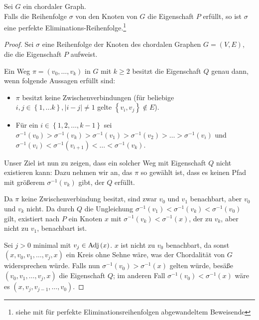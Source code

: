 \begin{theorem}
	Sei \( G \) ein chordaler Graph.\\
	Falls die Reihenfolge \( \sigma \) von den Knoten von \( G \) die Eigenschaft \( P \) erfüllt, so ist \( \sigma \) eine perfekte Eliminations-Reihenfolge.\footnote{siehe \cite[Lemma 4]{tarjanyannakakis} mit für perfekte Eliminationsreihenfolgen abgewandeltem Beweisende}
	\label{theorem:auspfolgtchordal}
\end{theorem}

\begin{proof}
	Sei \( \sigma \) eine Reihenfolge der Knoten des chordalen Graphen \( G = \left( V, E \right) \), die die Eigenschaft \( P \) aufweist.

	Ein Weg \( \pi = \left( v_0, \ldots, v_k \right) \) in \( G \) mit \( k \geq 2 \) besitzt die Eigenschaft \( Q \) genau dann, wenn folgende Aussagen erfüllt sind:

	\begin{itemize}
		\item \( \pi \) besitzt keine Zwischenverbindungen (für beliebige \( i, j \in \left\lbrace 1, \ldots k \right\rbrace, \left| i - j \right| \neq 1 \) gelte \( \left\lbrace v_i, v_j\right\rbrace \not\in E \)).
		\item Für ein \( i \in \left\lbrace 1, 2, \ldots, k - 1 \right\rbrace \) sei \( \sigma^{-1} \left( v_0 \right) > \sigma^{-1} \left( v_k \right) > \sigma^{-1} \left( v_1 \right)  >  \sigma^{-1} \left( v_2 \right) > \ldots > \sigma^{-1} \left( v_i \right) \) und \( \sigma^{-1} \left( v_i \right) < \sigma^{-1} \left( v_{i + 1} \right) < \ldots < \sigma^{-1} \left( v_k \right) \).
	\end{itemize}

	Unser Ziel ist nun zu zeigen, dass ein solcher Weg mit Eigenschaft \( Q \) nicht existieren kann: Dazu nehmen wir an, das \( \pi \) so gewählt ist, dass es keinen Pfad mit größerem \( \sigma^{-1} \left( v_k \right) \) gibt, der \( Q \) erfüllt.

	Da \( \pi \) keine Zwischenverbindung besitzt, sind zwar \( v_0 \) und \( v_1 \) benachbart, aber \( v_0 \) und \( v_k \) nicht. Da durch \( Q \) die Ungleichung \( \sigma^{-1} \left( v_1 \right) < \sigma^{-1} \left( v_k \right) < \sigma^{-1} \left( v_0 \right) \) gilt, existiert nach \( P \) ein Knoten \( x \) mit \( \sigma^{-1} \left( v_k \right) < \sigma^{-1} \left( x \right) \), der zu \( v_k \), aber nicht zu \( v_1 \), benachbart ist.

	Sei \( j > 0 \) minimal mit \( v_j \in \textnormal{Adj} \left( x \right) \). \( x \) ist nicht zu \( v_0 \) benachbart, da sonst \( \left( x, v_0, v_1, \ldots, v_j, x \right) \) ein Kreis ohne Sehne wäre, was der Chordalität von \( G \) widersprechen würde. Falls nun \( \sigma^{-1} \left( v_0 \right) > \sigma^{-1} \left( x \right) \) gelten würde, besäße \( \left( v_0, v_1, \ldots, v_j, x\right) \) die Eigenschaft \( Q \); im anderen Fall \( \sigma^{-1} \left( v_0 \right) < \sigma^{-1} \left( x \right) \) wäre es \( \left( x, v_{j}, v_{j-1}, \ldots, v_0 \right) \).


\end{proof}
